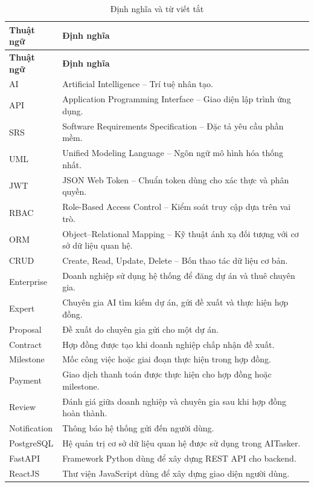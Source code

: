 \begin{longtable}{|p{3.2cm}|p{10.2cm}|}
    \caption{Định nghĩa và từ viết tắt}
    \label{tab:definitions-acronyms} \\ \hline
    \textbf{Thuật ngữ} & \textbf{Định nghĩa} \\ \hline
    \endfirsthead

    \hline
    \textbf{Thuật ngữ} & \textbf{Định nghĩa} \\ \hline
    \endhead

    AI & Artificial Intelligence -- Trí tuệ nhân tạo. \\ \hline
    API & Application Programming Interface -- Giao diện lập trình ứng dụng. \\ \hline
    SRS & Software Requirements Specification -- Đặc tả yêu cầu phần mềm. \\ \hline
    UML & Unified Modeling Language -- Ngôn ngữ mô hình hóa thống nhất. \\ \hline
    JWT & JSON Web Token -- Chuẩn token dùng cho xác thực và phân quyền. \\ \hline
    RBAC & Role-Based Access Control -- Kiểm soát truy cập dựa trên vai trò. \\ \hline
    ORM & Object--Relational Mapping -- Kỹ thuật ánh xạ đối tượng với cơ sở dữ liệu quan hệ. \\ \hline
    CRUD & Create, Read, Update, Delete -- Bốn thao tác dữ liệu cơ bản. \\ \hline
    Enterprise & Doanh nghiệp sử dụng hệ thống để đăng dự án và thuê chuyên gia. \\ \hline
    Expert & Chuyên gia AI tìm kiếm dự án, gửi đề xuất và thực hiện hợp đồng. \\ \hline
    Proposal & Đề xuất do chuyên gia gửi cho một dự án. \\ \hline
    Contract & Hợp đồng được tạo khi doanh nghiệp chấp nhận đề xuất. \\ \hline
    Milestone & Mốc công việc hoặc giai đoạn thực hiện trong hợp đồng. \\ \hline
    Payment & Giao dịch thanh toán được thực hiện cho hợp đồng hoặc milestone. \\ \hline
    Review & Đánh giá giữa doanh nghiệp và chuyên gia sau khi hợp đồng hoàn thành. \\ \hline
    Notification & Thông báo hệ thống gửi đến người dùng. \\ \hline
    PostgreSQL & Hệ quản trị cơ sở dữ liệu quan hệ được sử dụng trong AITasker. \\ \hline
    FastAPI & Framework Python dùng để xây dựng REST API cho backend. \\ \hline
    ReactJS & Thư viện JavaScript dùng để xây dựng giao diện người dùng. \\ \hline
\end{longtable}

